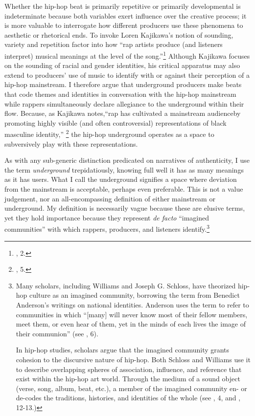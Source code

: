 Whether the hip-hop beat is primarily repetitive or primarily developmental is indeterminate because 
both variables exert influence over the creative process; it is more valuable to interrogate how different
producers use these phenomena to aesthetic or rhetorical ends. To invoke Loren Kajikawa's notion of
sounding, variety and repetition factor into how ``rap artists produce (and listeners interpret) musical
meanings at the level of the song.''\footnote{\cite{lorenkajikawaSoundingRaceRap2015}, 2.} Although Kajikawa
focuses on the sounding of racial and gender identities, his critical apparatus may also extend to producers'
use of music to identify with or against their perception of a hip-hop mainstream. I therefore argue that
underground producers make beats that code themes and identities in conversation with the hip-hop mainstream
while rappers simultaneously declare allegiance to the underground within their flow. Because, as Kajikawa
notes,``rap has cultivated a mainstream audience\textellipsis by promoting highly visible (and often
controversial) representations of black masculine identity,''
\footnote{\cite{lorenkajikawaSoundingRaceRap2015}, 5.} the hip-hop underground operates as a 
space to subversively play with these representations.

As with any sub-generic distinction predicated on narratives of authenticity, I use the term
\emph{underground} trepidatiously, knowing full well it has as many meanings as it has users. What I 
call the underground signifies a space where deviation from the mainstream is acceptable, perhaps even
preferable. This is not a value judgement, nor an all-encompassing definition of either mainstream or
underground. My definition is necessarily vague because these are elusive terms, yet they hold importance
because they represent \textit{de facto} ``imagined communities'' with which rappers, producers, and
listeners identify.\footnote{Many scholars, including Williams and Joseph G. Schloss, have theorized 
hip-hop culture as an imagined community, borrowing the term from Benedict Anderson's writings on national
identities. Anderson uses the term to refer to communities in which ``[many] will never know most of their
fellow members, meet them, or even hear of them, yet in the minds of each lives the image of their
communion'' (see \cite{benedictandersonImaginedCommunitiesReflections2006}, 6).

In hip-hop studies, scholars argue that the imagined community grants cohesion to the discursive 
nature of hip-hop. Both Schloss and Williams use it to describe overlapping spheres of association,
influence, and reference that exist within the hip-hop art world. Through the medium of a sound object
(verse, song, album, beat, etc.), a member of the imagined community en- or de-codes the traditions,
histories, and identities of the whole (see \cite{josephgschlossMakingBeatsArt2004}, 4, and
\cite{justinawilliamsRhyminStealinMusical2013}, 12-13.)}

